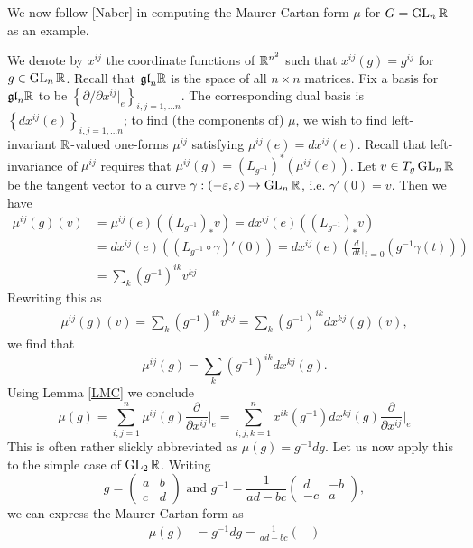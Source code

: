 \begin{exmp}
    We now follow [Naber] in computing the Maurer-Cartan form $\mu$ for $G=\operatorname{GL}_n\mathbb{R}$ as an example. 

    We denote by $x^{ij}$ the coordinate functions of $\mathbb{R}^{n^2}$ such that $x^{ij}(g)=g^{ij}$ for $g\in\operatorname{GL}_n\mathbb{R}$. Recall that $\mathfrak{gl}_n\mathbb{R}$ is the space of
    all $n\times n$ matrices. Fix a basis for $\mathfrak {gl}_n\mathbb{R}$ to be $\left\{ \partial/\partial x^{ij}|_{e} \right\}_{i,j=1,\ldots n}$.
    The corresponding dual basis is $\left\{ dx^{ij}(e) \right\}_{i,j=1,\ldots n}$; to find (the components of) $\mu$, we wish to
    find left-invariant $\mathbb{R}$-valued one-forms $\mu^{ij}$ satisfying $\mu^{ij}(e)=dx^{ij}(e)$. Recall that left-invariance of $\mu^{ij}$ requires that
    $\mu^{ij}(g)=\left( L_{g^{-1}} \right)^*(\mu^{ij}(e))$. Let $v\in T_g\operatorname{GL}_n\mathbb{R}$ be the tangent vector to a curve $\gamma:(-\varepsilon,\varepsilon)\to\operatorname{GL}_n\mathbb{R}$,
    i.e. $\gamma'(0)=v$. Then we have
    \begin{align*}
        \mu^{ij}(g)(v)&=\mu^{ij}(e)\left( (L_{g^{-1}})_*v \right)=dx^{ij}(e)\left( (L_{g^{-1}})_*v \right)\\
        &=dx^{ij}(e)\left( (L_{g^{-1}}\circ\gamma)'(0) \right)=dx^{ij}(e)\left(\frac{d}{dt}\bigg|_{t=0}(g^{-1}\gamma(t))  \right)\\
        &=\sum_k\left(g^{-1}\right)^{ik}v^{kj}
    \end{align*}
    Rewriting this as
    \begin{align*}
        \mu^{ij}(g)(v)=\sum_k\left(g^{-1}\right)^{ik}v^{kj}=\sum_k(g^{-1})^{ik}dx^{kj}(g)(v),
    \end{align*}
    we find that
    \[\mu^{ij}(g)=\sum_k (g^{-1})^{ik}dx^{kj}(g).\]
    Using Lemma \ref{LMC} we conclude
    \[\mu(g)=\sum_{i,j=1}^n\mu^{ij}(g)\frac{\partial}{\partial x^{ij}}\bigg|_{e}=\sum_{i,j,k=1}^nx^{ik}(g^{-1})dx^{kj}(g)\frac{\partial}{\partial x^{ij}}\bigg|_{e}\]
    This is often rather slickly abbreviated as $\mu(g)=g^{-1}dg$. Let us now apply this to the simple case of $\operatorname{GL}_2\mathbb{R}$. Writing
    \[g=\begin{pmatrix}
            a&b\\c&d
        \end{pmatrix}\text{ and }g^{-1}=\frac{1}{ad-bc}\begin{pmatrix}
            d&-b\\-c&a
        \end{pmatrix},
    \]
    we can express the Maurer-Cartan form as
    \begin{align*}
        \mu(g)&=g^{-1}dg=\frac{1}{ad-bc}\begin{pmatrix}

\end{pmatrix}
\end{align*}
\end{exmp}
